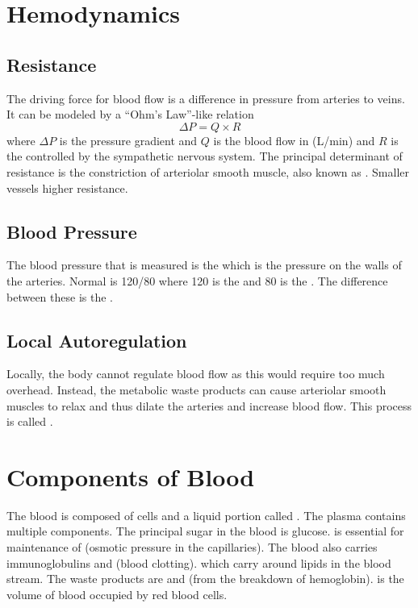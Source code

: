 \documentclass[../Bio_chemistryReview.tex]{subfiles}
\begin{document}
\section{Hemodynamics}
\subsection{Resistance}
The driving force for blood flow is a difference in pressure from arteries to
veins. It can be modeled by a ``Ohm's Law''-like relation
\begin{equation}
  \Delta P = Q \times R
\end{equation}
where $ \Delta P $ is the pressure gradient and $ Q $ is the blood flow in
(L/min) and $ R $ is the  controlled by the
sympathetic nervous system. The principal determinant of resistance is the
constriction of arteriolar smooth muscle, also known as . Smaller vessels \imp higher resistance. 

\subsection{Blood Pressure}
The blood pressure that is measured is the 
which is the pressure on the walls of the arteries. Normal is 120/80 where 120
is the  and 80 is the .
The difference between these is the .\par

\subsection{Local Autoregulation}
Locally, the body cannot regulate blood flow as this would require too much
overhead. Instead, the metabolic waste products can cause arteriolar smooth
muscles to relax and thus dilate the arteries and increase blood flow. This
process is called .

\section{Components of Blood}
The blood is composed of cells and a liquid portion called . The
plasma contains multiple components. The principal sugar in the blood is
glucose.  is essential for maintenance of  (osmotic pressure in the capillaries). The blood also carries
immunoglobulins and  (blood clotting). 
which carry around lipids in the blood stream. The waste products are
 and  (from the breakdown of hemoglobin).
 is the volume of blood occupied by red blood cells.
\end{document}
